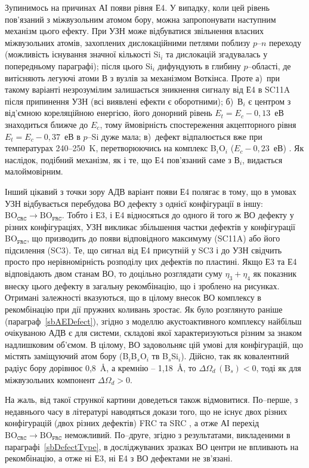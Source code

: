 Зупинимось на причинах АІ появи рівня Е4.
У випадку, коли цей рівень пов'язаний з міжвузольним атомом бору, можна запропонувати наступним механізм цього ефекту.
При УЗН може відбуватися звільнення власних міжвузольних атомів, захоплених дислокаційними петлями поблизу $p$--$n$ переходу (можливість існування значної кількості Si$_i$ та дислокацій згадувалась у попередньому параграфі);
після цього Si$_i$ дифундують в глибину $p$--області, де витісняють легуючі атоми В з вузлів за механізмом Воткінса.
Проте
а)~при такому варіанті незрозумілим залишається зникнення сигналу від Е4 в SC11A після припинення УЗН (всі виявлені ефекти є оборотними);
б)~В$_i$ є центром з від'ємною кореляційною енергією, його донорний рівень $E_t=E_c-0,13$~еВ \cite{Bi:Harris} знаходиться ближче до $E_c$, тому ймовірність спостереження акцепторного рівня
$E_t=E_c-0,37$~еВ в $p$--Si дуже мала;
в)~дефект відпалюється вже при температурах 240--250~K, перетворюючись на комплекс B$_i$O$_i$ ($E_c-0,23$~еВ) \cite{PhysRevB94}.
Як наслідок, подібний механізм, як і те, що Е4 пов'язаний саме з В$_i$, видається малоймовірним.

Інший цікавий з точки зору АДВ варіант появи Е4 полягає в тому, що в умовах УЗН відбувається
перебудова ВО дефекту з однієї конфігурації в іншу: $\mbox{BO}_\mathtt{CRC} \rightarrow \mbox{BO}_\mathtt{FRC}$.
Тобто і Е3, і Е4 відносяться до одного й того ж ВО дефекту у різних конфігураціях,
УЗН викликає збільшення частки дефектів у конфігурації  BO$_\mathtt{FRC}$, що призводить до появи відповідного максимуму (SC11A) або його підсилення (SC3).
Те, що сигнал від Е4 присутній у SC3 і до УЗН свідчить просто про нерівномірність розподілу цих дефектів по пластині.
Якщо Е3 та Е4 відповідають двом станам ВО, то доцільно розглядати суму $\eta_3+\eta_4$ як показник внеску цього дефекту в загальну рекомбінацію, що і зроблено на рисунках.
Отримані залежності вказуються, що в цілому внесок ВО комплексу в рекомбінацію при дії пружних коливань зростає.
Як було розглянуто раніше (параграф~\ref{sbAEDefect}), згідно з моделлю акустоактивного комплексу найбільш очікуваною АДВ є для системи, складові якої характеризуються різним за знаком надлишковим об'ємом.
В цілому, ВО задовольняє цій умові для конфігурацій, що містять заміщуючий атом бору (B$_i$B$_s$O$_i$ тв B$_s$Si$_i$).
Дійсно, так як ковалентний радіус бору дорівнює 0,8~{\AA}, а кремнію -- 1,18~{\AA},
то $\Delta\Omega_d\,(\mbox{B}_s)<0$,
тоді як для міжвузольних компонент $\Delta\Omega_d>0$.

На жаль, від такої стрункої картини доведеться також відмовитися.
По--перше, з недавнього часу в літературі наводяться докази того, що не існує двох
різних конфігурацій  (двох різних дефектів) FRC та SRC \cite{BOSingle:Voronkov,BO3i,BOSingle:SEMSS2017,Kim},
а отже АІ перехід $\mbox{BO}_\mathtt{CRC} \rightarrow \mbox{BO}_\mathtt{FRC}$ неможливий.
По--друге, згідно з результатами, викладеними в параграфі~\ref{sbDefectType},
в досліджуваних зразках ВО центри не впливають на рекомбінацію,
а отже ні Е3, ні Е4 з ВО дефектами не зв'язані.


